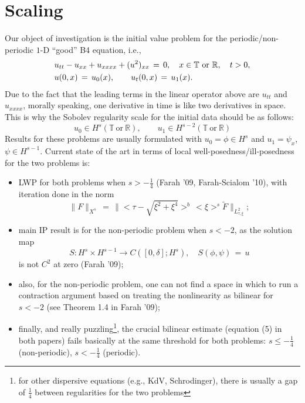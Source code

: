 \documentclass[12pt,reqno]{amsart}
\numberwithin{equation}{section}  %
\begin{document}
%
%
%
%
%
%
%
%
%
%
%
%
%
\section{Scaling} 
\label{sec:scaling}
Our object of investigation is the initial value problem for the
periodic/non-periodic $1$-D ``good'' B4 equation, i.e.,
\begin{equation}
  \aligned
  & u_{tt}-u_{xx}+u_{xxxx}+ (u^2)_{xx}\,=\,0, \quad x\in \mathbb{T}\ \text{or} \ \mathbb{R}, \quad t>0,\\
&u(0,x)\,=\,u_0(x),\qquad u_t(0,x)\,=\,u_1(x).\endaligned
\label{main}
\end{equation}
Due to the fact that the leading terms in the linear operator above are $u_{tt}$ and $u_{xxxx}$, morally speaking, one derivative in time is like two derivatives in space. This is why the Sobolev regularity scale for the initial data should be as follows:
\[
u_0\in H^s(\mathbb{T}\ \text{or} \ \mathbb{R}), \qquad u_1\in H^{s-2}(\mathbb{T}\ \text{or} \ \mathbb{R})
\]
Results for these problems are usually formulated with $u_0=\phi \in H^s$ and $u_1=\psi_x$, $\psi\in H^{s-1}$.
Current state of the art in terms of local well-posedness/ill-posedness for the two problems is:
\begin{itemize}
  \item LWP for both problems when $s>-\frac 14$ (Farah '09, Farah-Scialom '10), with iteration done in
    the norm
    \[
    \|F\|_{X^{s}}\,=\,\|<\tau-\sqrt{\xi^2+\xi^4}>^b\,<\xi>^s \tilde{F}\|_{L^2_{\tau,\xi}};
    \]
  \item main IP result is for the non-periodic problem when $s<-2$, as the solution map 
    \[
    S: H^s\times H^{s-1} \to C([0,\delta]; H^s), \quad
    S(\phi,\psi)\,=\,u
    \]
    is not $C^2$ at zero (Farah '09);
  \item also, for the non-periodic problem, one can not find a space in which to run a contraction argument based on treating the nonlinearity as bilinear for $s<-2$ (see Theorem 1.4 in Farah '09);
  \item finally, and really puzzling\footnote{for other dispersive equations (e.g., KdV, Schrodinger), there is usually a gap of $\frac 14$ between regularities for the two problems}, the crucial bilinear estimate (equation (5) in both papers) fails basically at the same threshold for both problems: $s\leq -\frac 14$ (non-periodic), $s<-\frac{1}{4}$ (periodic).
\end{itemize}
\end{document}

